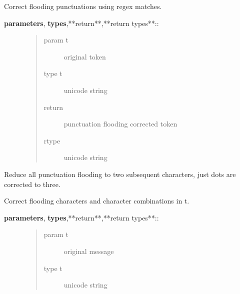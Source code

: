 \documentclass[letterpaper,10pt,english]{sphinxmanual}
\begin{document}
\begin{fulllineitems}
\begin{fulllineitems}
\end{fulllineitems}


\begin{fulllineitems}
\label{API:norm.modules.flooding.Flooding.correct_punctuation_flooding}
Correct flooding punctuations using regex matches.
\begin{description}
\item[{\textbf{parameters}, \textbf{types},**return**,**return types**::}] \leavevmode\begin{quote}\begin{description}
\item[{param t}] \leavevmode
original token

\item[{type t}] \leavevmode
unicode string

\item[{return}] \leavevmode
punctuation flooding corrected token

\item[{rtype}] \leavevmode
unicode string

\end{description}\end{quote}

\end{description}

Reduce all punctuation flooding to two subsequent characters, just dots are 
corrected to three.

\end{fulllineitems}


\begin{fulllineitems}
\label{API:norm.modules.flooding.Flooding.flooding_correct}
Correct flooding characters and character combinations in t.
\begin{description}
\item[{\textbf{parameters}, \textbf{types},**return**,**return types**::}] \leavevmode\begin{quote}\begin{description}
\item[{param t}] \leavevmode
original message

\item[{type t}] \leavevmode
unicode string


\end{description}
\end{quote}
\end{description}
\end{fulllineitems}
\end{fulllineitems}
\end{document}
